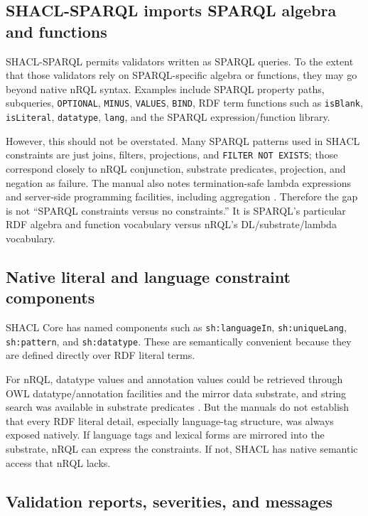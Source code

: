 \documentclass[11pt,letterpaper]{article}
\newcommand{\nrql}{nRQL}
\newcommand{\shacl}{SHACL}
\newcommand{\naf}{negation as failure}
\newcommand{\rdf}{RDF}
\newcommand{\owl}{OWL}
\begin{document}
\subsection{SHACL-SPARQL imports SPARQL algebra and functions}

\shacl{}-SPARQL permits validators written as SPARQL queries. To the extent that those validators rely on SPARQL-specific algebra or functions, they may go beyond native \nrql{} syntax. Examples include SPARQL property paths, subqueries, \texttt{OPTIONAL}, \texttt{MINUS}, \texttt{VALUES}, \texttt{BIND}, RDF term functions such as \texttt{isBlank}, \texttt{isLiteral}, \texttt{datatype}, \texttt{lang}, and the SPARQL expression/function library.

However, this should not be overstated. Many SPARQL patterns used in \shacl{} constraints are just joins, filters, projections, and \texttt{FILTER NOT EXISTS}; those correspond closely to \nrql{} conjunction, substrate predicates, projection, and \naf{}. The manual also notes termination-safe lambda expressions and server-side programming facilities, including aggregation \cite[p.~83]{racerug}. Therefore the gap is not ``SPARQL constraints versus no constraints.'' It is SPARQL's particular RDF algebra and function vocabulary versus \nrql{}'s DL/substrate/lambda vocabulary.

\subsection{Native literal and language constraint components}

\shacl{} Core has named components such as \texttt{sh:languageIn}, \texttt{sh:uniqueLang}, \texttt{sh:pattern}, and \texttt{sh:datatype}. These are semantically convenient because they are defined directly over \rdf{} literal terms.

For \nrql{}, datatype values and annotation values could be retrieved through \owl{} datatype/annotation facilities and the mirror data substrate, and string search was available in substrate predicates \cite[pp.~141--143,155--156]{racerug}. But the manuals do not establish that every \rdf{} literal detail, especially language-tag structure, was always exposed natively. If language tags and lexical forms are mirrored into the substrate, \nrql{} can express the constraints. If not, \shacl{} has native semantic access that \nrql{} lacks.

\subsection{Validation reports, severities, and messages}
\end{document}
